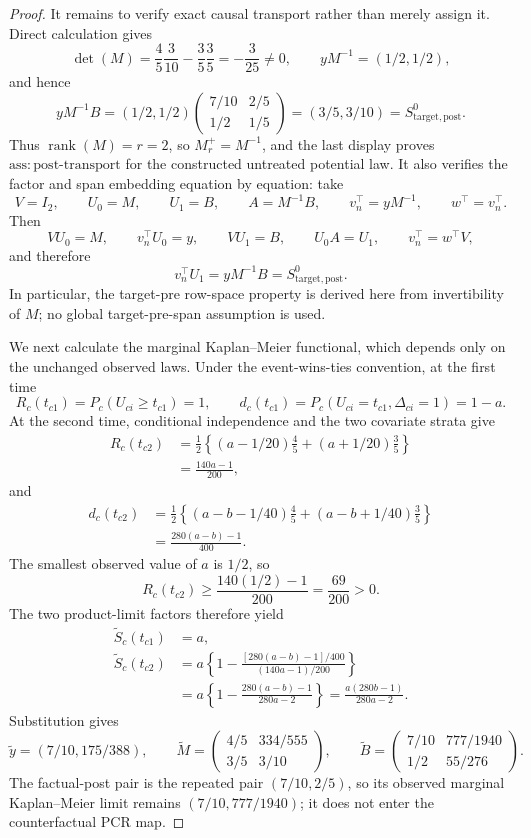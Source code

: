 \documentclass{article}
\begin{document}
\begin{proof}
It remains to verify exact causal transport rather than merely assign it. Direct calculation gives
\[
\det(M)=\frac45\frac3{10}-\frac35\frac35=-\frac3{25}\ne0,
\qquad
yM^{-1}=(1/2,1/2),
\]
and hence
\[
yM^{-1}B=(1/2,1/2)
\begin{pmatrix}7/10&2/5\\1/2&1/5\end{pmatrix}
=(3/5,3/10)=S^0_{\mathrm{target,post}}.
\]
Thus \(\operatorname{rank}(M)=r=2\), so \(M_r^+=M^{-1}\), and the last display proves \(\mathrm{ass{:}post\mbox{-}transport}\) for the constructed untreated potential law. It also verifies the factor and span embedding equation by equation: take
\[
V=I_2,\qquad U_0=M,\qquad U_1=B,\qquad
A=M^{-1}B,\qquad v_n^\top=yM^{-1},\qquad w^\top=v_n^\top.
\]
Then
\[
VU_0=M,\qquad v_n^\top U_0=y,
\qquad VU_1=B,\qquad U_0A=U_1,
\qquad v_n^\top=w^\top V,
\]
and therefore
\[
v_n^\top U_1=yM^{-1}B=S^0_{\mathrm{target,post}}.
\]
In particular, the target-pre row-space property is derived here from invertibility of \(M\); no global target-pre-span assumption is used.

We next calculate the marginal Kaplan--Meier functional, which depends only on the unchanged observed laws. Under the event-wins-ties convention, at the first time
\[
R_c(t_{c1})=P_c(U_{ci}\ge t_{c1})=1,
\qquad
d_c(t_{c1})=P_c(U_{ci}=t_{c1},\Delta_{ci}=1)=1-a.
\]
At the second time, conditional independence and the two covariate strata give
\[
\begin{aligned}
R_c(t_{c2})
&=\frac12\left\{(a-1/20)\frac45+(a+1/20)\frac35\right\}\\
&=\frac{140a-1}{200},
\end{aligned}
\]
and
\[
\begin{aligned}
d_c(t_{c2})
&=\frac12\left\{(a-b-1/40)\frac45
 +(a-b+1/40)\frac35\right\}\\
&=\frac{280(a-b)-1}{400}.
\end{aligned}
\]
The smallest observed value of \(a\) is \(1/2\), so
\[
R_c(t_{c2})\ge\frac{140(1/2)-1}{200}=\frac{69}{200}>0.
\]
The two product-limit factors therefore yield
\[
\begin{aligned}
\widetilde S_c(t_{c1})&=a,\\
\widetilde S_c(t_{c2})
&=a\left\{1-\frac{[280(a-b)-1]/400}{(140a-1)/200}\right\}\\
&=a\left\{1-\frac{280(a-b)-1}{280a-2}\right\}
=\frac{a(280b-1)}{280a-2}.
\end{aligned}
\]
Substitution gives
\[
\widetilde y=(7/10,175/388),\qquad
\widetilde M=\begin{pmatrix}4/5&334/555\\3/5&3/10\end{pmatrix},\qquad
\widetilde B=\begin{pmatrix}7/10&777/1940\\1/2&55/276\end{pmatrix}.
\]
The factual-post pair is the repeated pair \((7/10,2/5)\), so its observed marginal Kaplan--Meier limit remains \((7/10,777/1940)\); it does not enter the counterfactual PCR map.


\end{proof}
\end{document}
